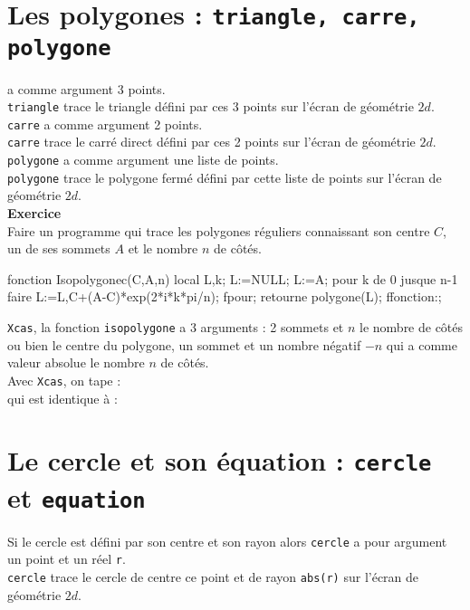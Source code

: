 \documentclass[12pt,a4paper]{book}
\begin{document}
\begin{giacjshere}
\section{Les polygones : {\tt triangle, carre, polygone}}
 a comme argument 3 points.\\
{\tt triangle} trace le triangle d\'efini par ces 3 points sur l'\'ecran de 
g\'eom\'etrie $2d$.\\
{\tt carre} a comme argument 2 points.\\
{\tt carre} trace le carr\'e direct d\'efini par ces 2 points sur l'\'ecran de 
g\'eom\'etrie $2d$.\\
{\tt polygone} a comme argument une liste de points.\\
{\tt polygone} trace le polygone ferm\'e d\'efini par cette liste de points sur 
l'\'ecran de g\'eom\'etrie $2d$.\\
{\bf Exercice}\\
Faire un programme qui trace les polygones r\'eguliers connaissant son centre 
$C$, un de ses sommets $A$ et le nombre $n$ de c\^ot\'es.\\
\begin{giaconload}
fonction Isopolygonec(C,A,n)
 local L,k;
 L:=NULL;
 L:=A;
 pour k de 0 jusque n-1 faire
   L:=L,C+(A-C)*exp(2*i*k*pi/n);
 fpour;
 retourne polygone(L);
ffonction:;
\end{giaconload}
{\tt Xcas}, la fonction {\tt isopolygone} a 3 arguments  : 2 sommets 
 et $n$ le nombre de c\^ot\'es ou bien le centre du polygone, un sommet 
et un nombre n\'egatif $-n$ qui a comme valeur absolue le nombre $n$ de 
c\^ot\'es.\\
Avec {\tt Xcas}, on tape :\\
qui est identique \`a :\\

\section{Le cercle  et son \'equation : {\tt cercle} et {\tt equation}}
Si le cercle est d\'efini par son centre et son rayon alors
{\tt cercle} a pour argument un point et un r\'eel {\tt r}.\\ 
{\tt cercle} trace le cercle de centre ce point et de rayon {\tt abs(r)}
sur l'\'ecran de g\'eom\'etrie $2d$.\\ 


\end{giacjshere}
\end{document}
